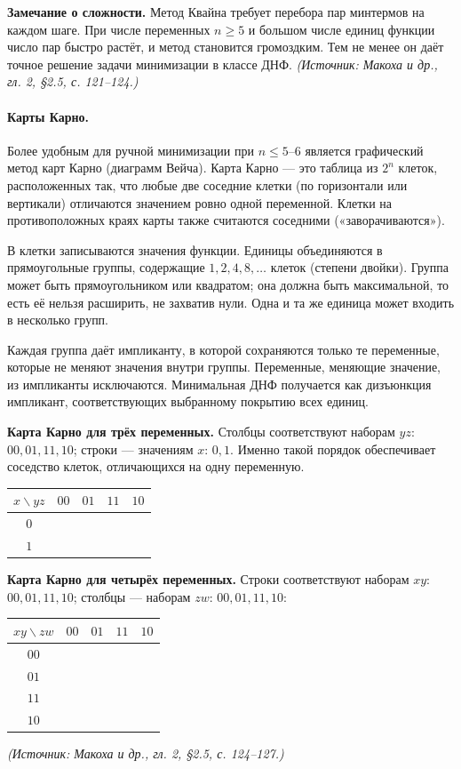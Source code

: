 \documentclass[a4paper,12pt]{article}
\begin{document}
\textbf{Замечание о сложности.} Метод Квайна требует перебора пар минтермов на каждом шаге. При числе переменных \(n\ge 5\) и большом числе единиц функции число пар быстро растёт, и метод становится громоздким. Тем не менее он даёт точное решение задачи минимизации в классе ДНФ.
\textit{(Источник: Макоха и др., гл. 2, §2.5, с. 121--124.)}

\paragraph{Карты Карно.}
Более удобным для ручной минимизации при \(n\le 5\)--\(6\) является графический метод карт Карно (диаграмм Вейча). Карта Карно — это таблица из \(2^n\) клеток, расположенных так, что любые две соседние клетки (по горизонтали или вертикали) отличаются значением ровно одной переменной. Клетки на противоположных краях карты также считаются соседними («заворачиваются»).

В клетки записываются значения функции. Единицы объединяются в прямоугольные группы, содержащие \(1,2,4,8,\ldots\) клеток (степени двойки). Группа может быть прямоугольником или квадратом; она должна быть максимальной, то есть её нельзя расширить, не захватив нули. Одна и та же единица может входить в несколько групп.

Каждая группа даёт импликанту, в которой сохраняются только те переменные, которые не меняют значения внутри группы. Переменные, меняющие значение, из импликанты исключаются. Минимальная ДНФ получается как дизъюнкция импликант, соответствующих выбранному покрытию всех единиц.

\textbf{Карта Карно для трёх переменных.} Столбцы соответствуют наборам \(yz\): \(00,01,11,10\); строки — значениям \(x\): \(0,1\). Именно такой порядок обеспечивает соседство клеток, отличающихся на одну переменную.
\begin{center}
\begin{tabular}{c|cccc}
\toprule
\(x\backslash yz\) & \(00\) & \(01\) & \(11\) & \(10\) \\
\midrule
\(0\) & & & & \\
\(1\) & & & & \\
\bottomrule
\end{tabular}
\end{center}

\textbf{Карта Карно для четырёх переменных.} Строки соответствуют наборам \(xy\): \(00,01,11,10\); столбцы — наборам \(zw\): \(00,01,11,10\):
\begin{center}
\begin{tabular}{c|cccc}
\toprule
\(xy\backslash zw\) & \(00\) & \(01\) & \(11\) & \(10\) \\
\midrule
\(00\) & & & & \\
\(01\) & & & & \\
\(11\) & & & & \\
\(10\) & & & & \\
\bottomrule
\end{tabular}
\end{center}
\textit{(Источник: Макоха и др., гл. 2, §2.5, с. 124--127.)}
\end{document}
